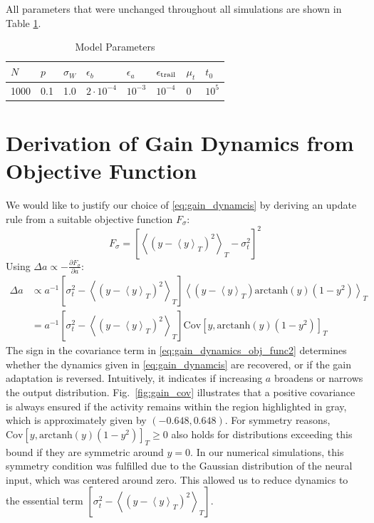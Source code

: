 \documentclass[10pt,a4paper]{article}
\newcommand{\avgt}[1]{\left< #1 \right>_T}
\begin{document}
All parameters that were unchanged throughout all simulations are shown in Table \ref{tab:params}.

\begin{table}[h]
	\caption{Model Parameters}
	\centering
	\vspace{5pt}
	\begin{tabular}{ l | l | l | l | l | l | l | l }
		 $N$ & $p$ & $\sigma_{W}$ & $\epsilon_{b}$ & $\epsilon_{a}$ & $\epsilon_{\rm trail}$ & $\mu_{t}$ & $t_0$  \\
		\hline
		\hline
		\rule{0pt}{12pt}
		1000 & 0.1 & 1.0 & $2\cdot 10^{-4}$ & $10^{-3}$ & $10^{-4}$ & 0 & $10^5$
	\end{tabular}
	\label{tab:params}
\end{table}

\section{Derivation of Gain Dynamics from Objective Function}
We would like to justify our choice of \eqref{eq:gain_dynamcis} by deriving an update rule from a suitable objective function $F_{\sigma}$:
\begin{equation}
F_{\sigma} = \left[\avgt{\left(y-\avgt{y}\right)^2} - \sigma^2_{t}\right]^2
\end{equation}
Using $\Delta a \propto - \frac{\partial F_\sigma}{\partial a}$:
\begin{align}
\Delta a &\propto a^{-1} \left[\sigma^2_{t} - \avgt{\left(y-\avgt{y}\right)^2}\right]\avgt{\left(y-\avgt{y}\right)\mathrm{arctanh}(y)\left(1-y^2\right)} \label{eq:gain_dynamics_obj_func1} \\
&=a^{-1} \left[\sigma^2_{t} - \avgt{\left(y-\avgt{y}\right)^2}\right]\mathrm{Cov}\left[ y,\mathrm{arctanh}(y)\left(1-y^2\right) \right]_T \label{eq:gain_dynamics_obj_func2}
\end{align}
The sign in the covariance term in \eqref{eq:gain_dynamics_obj_func2} determines whether the dynamics given in \eqref{eq:gain_dynamcis} are recovered, or if the gain adaptation is reversed. Intuitively, it indicates if increasing $a$ broadens or narrows the output distribution. Fig.~\ref{fig:gain_cov} illustrates that a positive covariance is always ensured if the activity remains within the region highlighted in gray, which is approximately given by $(-0.648,0.648)$. For symmetry reasons, $\mathrm{Cov}\left[ y,\mathrm{arctanh}(y)\left(1-y^2\right) \right]_T \geq 0$ also holds for distributions exceeding this bound if they are symmetric around $y=0$. In our numerical simulations, this symmetry condition was fulfilled due to the Gaussian distribution of the neural input, which was centered around zero. This allowed us to reduce dynamics to the essential term $\left[\sigma^2_{t} - \avgt{\left(y-\avgt{y}\right)^2}\right]$.
\end{document}
